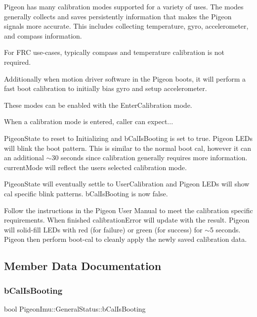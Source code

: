 Pigeon has many calibration modes supported for a variety of uses. The modes generally collects and saves persistently information that makes the Pigeon signals more accurate. This includes collecting temperature, gyro, accelerometer, and compass information.

For F\+RC use-\/cases, typically compass and temperature calibration is not required.

Additionally when motion driver software in the Pigeon boots, it will perform a fast boot calibration to initially bias gyro and setup accelerometer.

These modes can be enabled with the Enter\+Calibration mode.

When a calibration mode is entered, caller can expect...


\begin{DoxyItemize}
\item Pigeon\+State to reset to Initializing and b\+Cal\+Is\+Booting is set to true. Pigeon L\+E\+Ds will blink the boot pattern. This is similar to the normal boot cal, however it can an additional $\sim$30 seconds since calibration generally requires more information. current\+Mode will reflect the user\textquotesingle{}s selected calibration mode.
\item Pigeon\+State will eventually settle to User\+Calibration and Pigeon L\+E\+Ds will show cal specific blink patterns. b\+Cal\+Is\+Booting is now false.
\item Follow the instructions in the Pigeon User Manual to meet the calibration specific requirements. When finished calibration\+Error will update with the result. Pigeon will solid-\/fill L\+E\+Ds with red (for failure) or green (for success) for $\sim$5 seconds. Pigeon then perform boot-\/cal to cleanly apply the newly saved calibration data. 
\end{DoxyItemize}

\subsection{Member Data Documentation}
\mbox{\label{struct_pigeon_imu_1_1_general_status_ae453f6468362fd4162f74619d214ae2e}} 
\subsubsection{\texorpdfstring{b\+Cal\+Is\+Booting}{bCalIsBooting}}
{\footnotesize\ttfamily bool Pigeon\+Imu\+::\+General\+Status\+::b\+Cal\+Is\+Booting}

